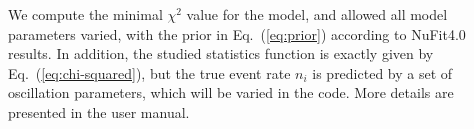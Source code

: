 \documentclass[aps,prd,nofootinbib,preprint]{revtex4}
\begin{document}
We compute the minimal $\chi^2$ value for the model, and allowed all model parameters varied, with the prior in Eq.~(\ref{eq:prior}) according to NuFit4.0 results.
In addition, the studied statistics function is exactly given by Eq.~(\ref{eq:chi-squared}), but the true event rate $n_i$ is predicted by a set of oscillation parameters, which will be varied in the code. 
%
%
%
More details are presented in the user manual. 


%
\end{document}
